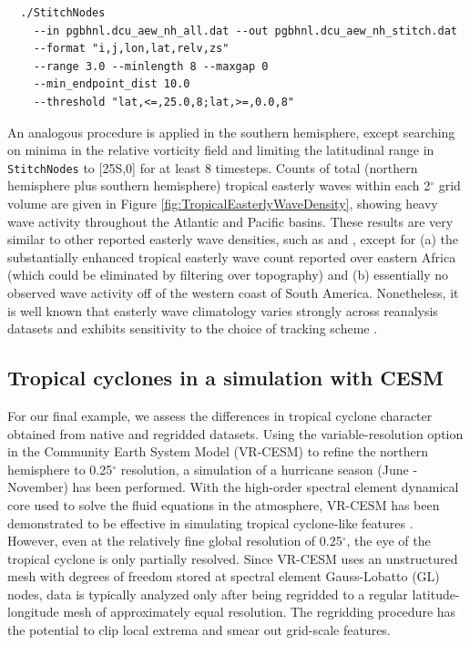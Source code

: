 \documentclass[gmdd, hvmath, online]{copernicus_discussions}
\begin{document}
{\small \begin{verbatim}
  ./StitchNodes
    --in pgbhnl.dcu_aew_nh_all.dat --out pgbhnl.dcu_aew_nh_stitch.dat
    --format "i,j,lon,lat,relv,zs"
    --range 3.0 --minlength 8 --maxgap 0
    --min_endpoint_dist 10.0
    --threshold "lat,<=,25.0,8;lat,>=,0.0,8"
\end{verbatim}}

An analogous procedure is applied in the southern hemisphere, except searching on minima in the relative vorticity field and limiting the latitudinal range in \texttt{StitchNodes} to [25S,0] for at least 8 timesteps.  Counts of total (northern hemisphere plus southern hemisphere) tropical easterly waves within each 2$^\circ$ grid volume are given in Figure \ref{fig:TropicalEasterlyWaveDensity}, showing heavy wave activity throughout the Atlantic and Pacific basins.  These results are very similar to other reported easterly wave densities, such as \cite{belanger2014african} and \cite{thorncroft2001african}, except for (a) the substantially enhanced tropical easterly wave count reported over eastern Africa (which could be eliminated by filtering over topography) and (b) essentially no observed wave activity off of the western coast of South America.  Nonetheless, it is well known that easterly wave climatology varies strongly across reanalysis datasets and exhibits sensitivity to the choice of tracking scheme \citep{hodges2003comparison}.


\subsection{Tropical cyclones in a simulation with CESM} \label{sec:TropicalCycloneCESM}

For our final example, we assess the differences in tropical cyclone character obtained from native and regridded datasets.  {\color{red}Using the variable-resolution option in the Community Earth System Model (VR-CESM) to refine the northern hemisphere to 0.25$^\circ$ resolution, a simulation of a hurricane season (June - November) has been performed}.  With the high-order spectral element dynamical core used to solve the fluid equations in the atmosphere, VR-CESM has been demonstrated to be effective in simulating tropical cyclone-like features \citep{zarzycki2014multidecadal, zarzycki2014using}.  However, even at the relatively fine global resolution of 0.25$^\circ$, the eye of the tropical cyclone is only partially resolved.  Since VR-CESM uses an unstructured mesh with degrees of freedom stored at spectral element Gauss-Lobatto (GL) nodes, data is typically analyzed only after being regridded to a regular latitude-longitude mesh of approximately equal resolution.  The regridding procedure has the potential to clip local extrema and smear out grid-scale features.
\end{document}
